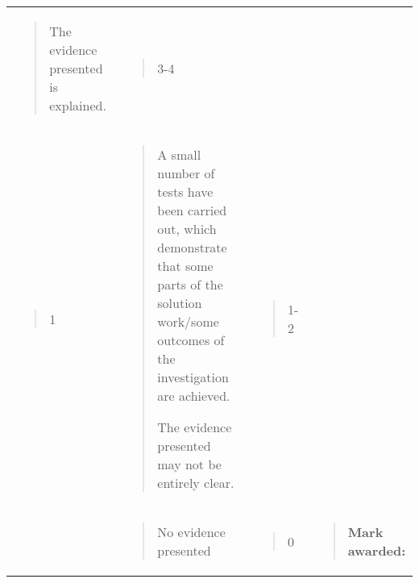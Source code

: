 \documentclass[
]{article}
\begin{document}
\begin{longtable}[]{@{}llll@{}}
\begin{minipage}[t]{0.22\columnwidth}
\begin{quote}
The evidence presented is explained.
\end{quote}\strut
\end{minipage} & \begin{minipage}[t]{0.22\columnwidth}\raggedright
\begin{quote}
3-4
\end{quote}\strut
\end{minipage} & \begin{minipage}[t]{0.22\columnwidth}\raggedright
\strut
\end{minipage}\tabularnewline
\begin{minipage}[t]{0.22\columnwidth}\raggedright
\begin{quote}
1
\end{quote}\strut
\end{minipage} & \begin{minipage}[t]{0.22\columnwidth}\raggedright
\begin{quote}
A small number of tests have been carried out, which demonstrate that
some parts of the solution work/some outcomes of the investigation are
achieved.

The evidence presented may not be entirely clear.
\end{quote}\strut
\end{minipage} & \begin{minipage}[t]{0.22\columnwidth}\raggedright
\begin{quote}
1-2
\end{quote}\strut
\end{minipage} & \begin{minipage}[t]{0.22\columnwidth}\raggedright
\strut
\end{minipage}\tabularnewline
\begin{minipage}[t]{0.22\columnwidth}\raggedright
\strut
\end{minipage} & \begin{minipage}[t]{0.22\columnwidth}\raggedright
\begin{quote}
No evidence presented
\end{quote}\strut
\end{minipage} & \begin{minipage}[t]{0.22\columnwidth}\raggedright
\begin{quote}
0
\end{quote}\strut
\end{minipage} & \begin{minipage}[t]{0.22\columnwidth}\raggedright
\begin{quote}
\textbf{Mark awarded:}
\end{quote}\strut
\end{minipage}\tabularnewline
\bottomrule
\end{longtable}
\end{document}
